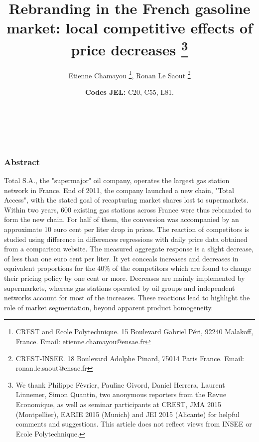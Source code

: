 \documentclass[english]{article}
\begin{document}
\title{Rebranding in the French gasoline market: local competitive effects
of price decreases%
\thanks{We thank Philippe Février, Pauline Givord, Daniel Herrera, Laurent
Linnemer, Simon Quantin, two anonymous reporters from the Revue Economique,
as well as seminar participants at CREST, JMA 2015 (Montpellier),
EARIE 2015 (Munich) and JEI 2015 (Alicante) for helpful comments and suggestions.
This article does not reflect views from INSEE or Ecole Polytechnique.%
}}


\author{Etienne Chamayou%
\thanks{CREST and Ecole Polytechnique. 15 Boulevard Gabriel Péri, 92240 Malakoff, France.
Email: etienne.chamayou@ensae.fr%
}, Ronan Le Saout%
\thanks{CREST-INSEE. 18 Boulevard Adolphe Pinard, 75014 Paris France. Email: ronan.le.saout@ensae.fr%
}}

\maketitle
\vspace{-1cm}
\ \\
\ \\
\subsubsection*{Abstract}

Total S.A., the "supermajor" oil company, operates the largest gas station network in France. End of 2011, the company launched a new chain, "Total Access", with the stated goal of recapturing market shares lost to supermarkets. Within two years, 600 existing gas stations across France were thus rebranded to form the new chain. For half of them, the conversion was accompanied by an approximate 10 euro cent per liter drop in prices. The reaction of competitors is studied using difference in differences regressions with daily price data obtained from a comparison website. The measured aggregate response is a slight decrease, of less than one euro cent per liter. It yet conceals increases and decreases in equivalent proportions for the 40\% of the competitors which are found to change their pricing policy by one cent or more. Decreases are mainly implemented by supermarkets, whereas gas stations operated by oil groups and independent networks account for most of the increases. These reactions lead to highlight the role of market segmentation, beyond apparent product homogeneity.

\medskip{}

\date{\noindent \textbf{Codes JEL:} C20, C55, L81.}
\end{document}
